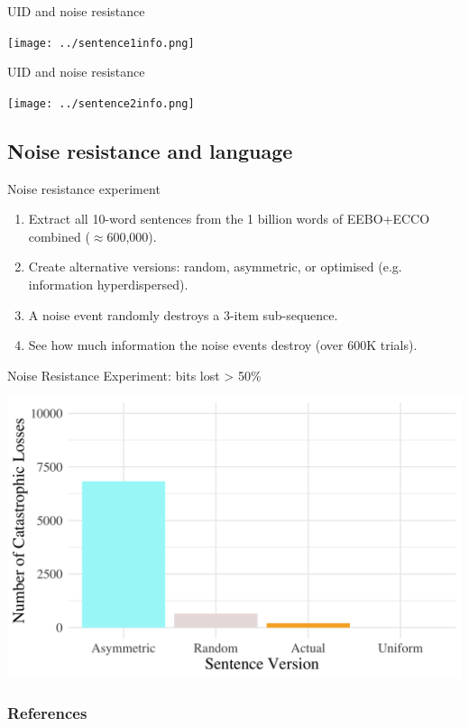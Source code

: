 \documentclass[hyperref={pdfpagelabels=false}]{beamer}
\begin{document}
\begin{frame}{UID and noise resistance} 

\begin{center}
\texttt{[image: ../sentence1info.png]} 
\end{center}

\end{frame}

\begin{frame}{UID and noise resistance} 

\begin{center}
	\texttt{[image: ../sentence2info.png]} 
\end{center}

\end{frame}


\subsection{Noise resistance and language}

\begin{frame}{Noise resistance experiment} 
\begin{enumerate}
	\item Extract all 10-word sentences from the 1 billion words of EEBO+ECCO combined ($\approx$600,000).
	\item Create alternative versions: random, asymmetric, or optimised (e.g. information hyperdispersed).
	\item A noise event randomly destroys a 3-item sub-sequence.
	\item See how much information the noise events destroy (over 600K trials).
\end{enumerate}
\end{frame}




\begin{frame}{Noise Resistance Experiment: bits lost > 50\%} 


\includegraphics[width=1.07\textwidth]{barplotpyccle.png}

\end{frame}






\begin{frame}[allowframebreaks]
\frametitle{References}
\newcommand*{\newblock}{natbib}


\end{frame}
\end{document}
